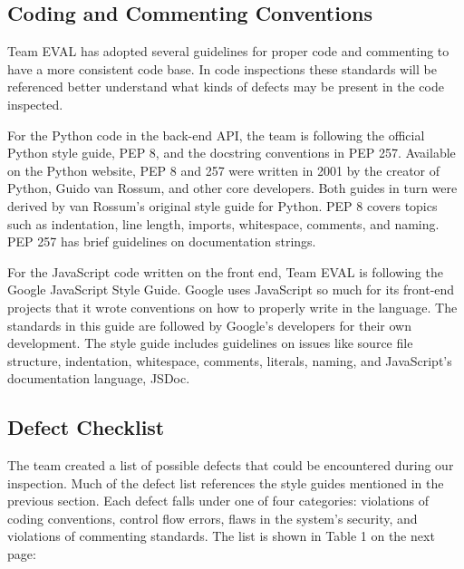 \documentclass{article}
\begin{document}
\subsection{Coding and Commenting Conventions}

Team EVAL has adopted several guidelines for proper code and commenting to have a more consistent code base. In code inspections these standards will be referenced better understand what kinds of defects may be present in the code inspected.

For the Python code in the back-end API, the team is following the official Python style guide, PEP 8, and the docstring conventions in PEP 257. Available on the Python website, PEP 8 and 257 were written in 2001 by the creator of Python, Guido van Rossum, and other core developers. Both guides in turn were derived by van Rossum's original style guide for Python. PEP 8 covers topics such as indentation, line length, imports, whitespace, comments, and naming. PEP 257 has brief guidelines on documentation strings.

For the JavaScript code written on the front end, Team EVAL is following the Google JavaScript Style Guide. Google uses JavaScript so much for its front-end projects that it wrote conventions on how to properly write in the language. The standards in this guide are followed by Google's developers for their own development. The style guide includes guidelines on issues like source file structure, indentation, whitespace, comments, literals, naming, and JavaScript's documentation language, JSDoc. 

\subsection{Defect Checklist}

The team created a list of possible defects that could be encountered during our inspection. Much of the defect list references the style guides mentioned in the previous section. Each defect falls under one of four categories: violations of coding conventions, control flow errors, flaws in the system's security, and violations of commenting standards. The list is shown in Table 1 on the next page:

\vspace{2cm}
\end{document}
